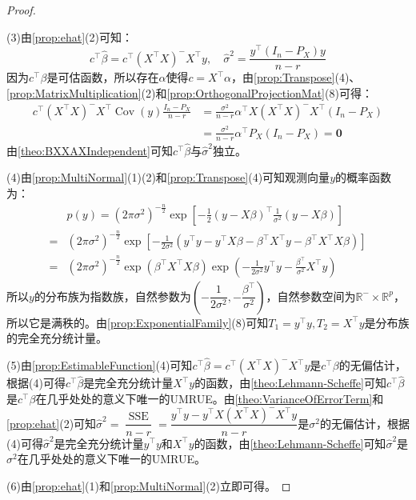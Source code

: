 \begin{proof}
\begin{equation*}
	\end{equation*}\par
	(3)由\cref{prop:ehat}(2)可知：
	\begin{equation*}
		c^{\top}\hat{\beta}=c^{\top}(X^{\top}X)^-X^{\top}y,\quad\hat{\sigma}^2=\frac{y^{\top}(I_n-P_X)y}{n-r}
	\end{equation*}
	因为$c^{\top}\beta$是可估函数，所以存在$\alpha$使得$c=X^{\top}\alpha$，由\cref{prop:Transpose}(4)、\cref{prop:MatrixMultiplication}(2)和\cref{prop:OrthogonalProjectionMat}(8)可得：
	\begin{align*}
		c^{\top}(X^{\top}X)^-X^{\top}\operatorname{Cov}(y)\frac{I_n-P_X}{n-r}&=\frac{\sigma^2}{n-r}\alpha^{\top}X(X^{\top}X)^-X^{\top}(I_n-P_X) \\
		&=\frac{\sigma^2}{n-r}\alpha^{\top}P_X(I_n-P_X)=\mathbf{0}
	\end{align*}
	由\cref{theo:BXXAXIndependent}可知$c^{\top}\hat{\beta}$与$\hat{\sigma}^2$独立。\par
	(4)由\cref{prop:MultiNormal}(1)(2)和\cref{prop:Transpose}(4)可知观测向量$y$的概率函数为：
	\begin{align*}
		&p(y)=(2\pi\sigma^2)^{-\frac{n}{2}}\exp\left[-\frac{1}{2}(y-X\beta)^{\top}\frac{1}{\sigma^2}(y-X\beta)\right] \\
		=&(2\pi\sigma^2)^{-\frac{n}{2}}\exp\left[-\frac{1}{2\sigma^2}(y^{\top}y-y^{\top}X\beta-\beta^{\top}X^{\top}y-\beta^{\top}X^{\top}X\beta)\right] \\
		=&(2\pi\sigma^2)^{-\frac{n}{2}}\exp(\beta^{\top}X^{\top}X\beta)\exp\left(-\frac{1}{2\sigma^2}y^{\top}y-\frac{\beta^{\top}}{\sigma^2}X^{\top}y\right)
	\end{align*}
	所以$y$的分布族为指数族，自然参数为$\left(-\dfrac{1}{2\sigma^2},-\dfrac{\beta^{\top}}{\sigma^2}\right)$，自然参数空间为$\mathbb{R}^{-}\times\mathbb{R}^{p}$，所以它是满秩的。由\cref{prop:ExponentialFamily}(8)可知$T_1=y^{\top}y,T_2=X^{\top}y$是分布族的完全充分统计量。\par
	(5)由\cref{prop:EstimableFunction}(4)可知$c^{\top}\hat{\beta}=c^{\top}(X^{\top}X)^-X^{\top}y$是$c^{\top}\beta$的无偏估计，根据(4)可得$c^{\top}\hat{\beta}$是完全充分统计量$X^{\top}y$的函数，由\cref{theo:Lehmann-Scheffe}可知$c^{\top}\hat{\beta}$是$c^{\top}\beta$在几乎处处的意义下唯一的UMRUE。由\cref{theo:VarianceOfErrorTerm}和\cref{prop:ehat}(2)可知$\hat{\sigma}^2=\dfrac{\operatorname{SSE}}{n-r}=\dfrac{y^{\top}y-y^{\top}X(X^{\top}X)^-X^{\top}y}{n-r}$是$\sigma^2$的无偏估计，根据(4)可得$\hat{\sigma}^2$是完全充分统计量$y^{\top}y$和$X^{\top}y$的函数，由\cref{theo:Lehmann-Scheffe}可知$\hat{\sigma}^2$是$\sigma^2$在几乎处处的意义下唯一的UMRUE。\par
	(6)由\cref{prop:ehat}(1)和\cref{prop:MultiNormal}(2)立即可得。
\end{proof}

